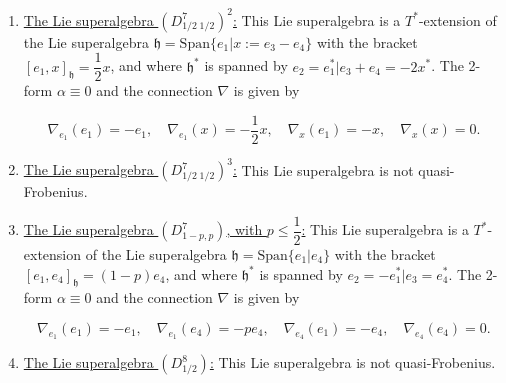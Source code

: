 \documentclass[12pt]{amsart}
\newcommand{\fh}{\mathfrak{h}}
\begin{document}
\begin{enumerate}
\begin{enumerate}
        \item If $x_3 \neq 0,$ and $ x_4\neq 0$. Since all the previous cases showed that we cannot find a Lagrangian ideal, and since the proof is symmetrical in X and Y without loss of generality we can state that $y_3 \neq 0, y_4\neq 0$. This implies that $e_2 \in \mathfrak{a}$ and that $x_2 e_2+\dfrac{1}{2}x_3 e_3 +\dfrac{1}{2}x_4 e_4 \in \mathfrak{a}$. We can write $X=e_2$ and $Y=z_3e_3+z_4e_4$. Once again, $\omega(Y,Y)=z_3^2+z_4^2\not =0$ which implies that $\mathfrak{a}$ is not Lagrangian.
    \end{enumerate}
    

    \item \underline{The Lie superalgebra $(D^{7}_{1/2\; 1/2})^2$:} This Lie superalgebra is a $T^*$-extension of the Lie superalgebra $\mathfrak{h}=\mathrm{Span}\{e_1 | x:=e_3-e_4\}$ with the bracket $[e_1,x]_\fh = \dfrac{1}{2}x$, and where $\mathfrak{h}^*$ is spanned by $e_2 = e_1^{*} | e_3+e_4 = -2x^{*}$. The 2-form $\alpha \equiv 0 $ and the connection $\nabla$ is given by
    
    \[\nabla_{e_1}(e_1) = -e_1,\quad  \nabla_{e_1}(x) = - \frac{1}{2}x, \quad  \nabla_{x}(e_1) = -x, \quad \nabla_{x}(x) = 0.\]

    \item \underline{The Lie superalgebra $(D^{7}_{1/2\; 1/2})^3$:} This Lie superalgebra is not quasi-Frobenius. 
    
    \item \underline{The Lie superalgebra $(D^{7}_{1-p,p})$, with $p\le \dfrac{1}{2}$:} This Lie superalgebra is a $T^*$-extension of the Lie superalgebra $\mathfrak{h}=\mathrm{Span}\{e_1 | e_4\}$ with the bracket $[e_1,e_4]_\fh = (1-p)e_4$, and where $\mathfrak{h}^*$ is spanned by $e_2 = - e_1^{*} | e_3 = e_4^{*}$. The 2-form $\alpha \equiv 0$ and the connection $\nabla$ is given by
    
    \[\nabla_{e_1}(e_1) =- e_1,\quad  \nabla_{e_1}(e_4) = - p e_4, \quad  \nabla_{e_4}(e_1) = - e_4, \quad \nabla_{e_4}(e_4) = 0.\]

    \item \underline{The Lie superalgebra $(D^{8}_{1/2})$:} This Lie superalgebra is not quasi-Frobenius. 


\end{enumerate}
\end{document}
